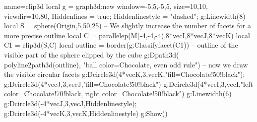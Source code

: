 \documentclass[border=5pt]{standalone}
\begin{document}
\begin{luadraw}{name=clip3d}
    local g = graph3d:new{
        window={-5,5,-5,5},
        size={10,10},
        viewdir={10,80},
    }
    Hiddenlines = true; Hiddenlinestyle = "dashed"; g:Linewidth(8)
    local S = sphere(Origin,5,50,25) -- We slightly increase the number of facets for a more precise outline
    local C = parallelep(M(-4,-4,-4),8*vecI,8*vecJ,8*vecK)
    local C1 = clip3d(S,C) 
    local outline = border(g:Classifyfacet(C1))  -- outline of the visible part of the sphere clipped by the cube
    g:Dpath3d( polyline2path3d(outline), "ball color=Chocolate, even odd rule")
    -- now we draw the visible circular facets
    g:Dcircle3d(4*vecK,3,vecK,"fill=Chocolate!50!black"); 
    g:Dcircle3d(4*vecJ,3,vecJ,"fill=Chocolate!50!black")
    g:Dcircle3d(4*vecI,3,vecI,"left color=Chocolate!70!black, right color=Chocolate!50!black") 
    g:Linewidth(6)
    g:Dcircle3d(-4*vecJ,3,vecJ,Hiddenlinestyle); g:Dcircle3d(-4*vecK,3,vecK,Hiddenlinestyle) 
    g:Show()
\end{luadraw}
\end{document}
